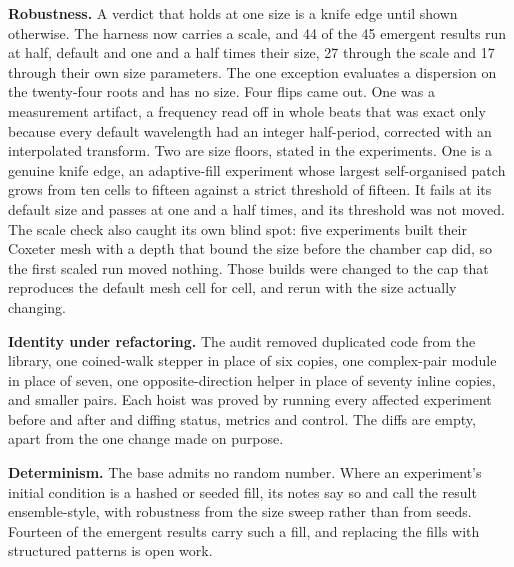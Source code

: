 \textbf{Robustness.} A verdict that holds at one size is a knife edge until shown otherwise. The harness now carries
a scale, and 44 of the 45 emergent results run at half, default and one and a half times their size, 27 through the
scale and 17 through their own size parameters. The one exception evaluates a dispersion on the twenty-four roots and
has no size. Four flips came out. One was a measurement artifact, a frequency read off in whole beats that was exact
only because every default wavelength had an integer half-period, corrected with an interpolated transform. Two are
size floors, stated in the experiments. One is a genuine knife edge, an adaptive-fill experiment whose largest
self-organised patch grows from ten cells to fifteen against a strict threshold of fifteen. It fails at its default
size and passes at one and a half times, and its threshold was not moved. The scale check also caught its own blind
spot: five experiments built their Coxeter mesh with a depth that bound the size before the chamber cap did, so the
first scaled run moved nothing. Those builds were changed to the cap that reproduces the default mesh cell for cell,
and rerun with the size actually changing.

\textbf{Identity under refactoring.} The audit removed duplicated code from the library, one coined-walk stepper in
place of six copies, one complex-pair module in place of seven, one opposite-direction helper in place of seventy
inline copies, and smaller pairs. Each hoist was proved by running every affected experiment before and after and
diffing status, metrics and control. The diffs are empty, apart from the one change made on purpose.

\textbf{Determinism.} The base admits no random number. Where an experiment's initial condition is a hashed or
seeded fill, its notes say so and call the result ensemble-style, with robustness from the size sweep rather than
from seeds. Fourteen of the emergent results carry such a fill, and replacing the fills with structured patterns is
open work.
